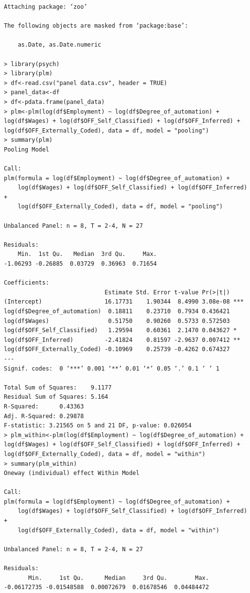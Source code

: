 \documentclass[12pt]{article}
\begin{document}
\begin{verbatim}
Attaching package: ‘zoo’

The following objects are masked from ‘package:base’:

    as.Date, as.Date.numeric

> library(psych)
> library(plm)
> df<-read.csv("panel data.csv", header = TRUE)
> panel_data<-df
> df<-pdata.frame(panel_data)
> plm<-plm(log(df$Employment) ~ log(df$Degree_of_automation) + log(df$Wages) + log(df$OFF_Self_Classified) + log(df$OFF_Inferred) + log(df$OFF_Externally_Coded), data = df, model = "pooling")
> summary(plm)
Pooling Model

Call:
plm(formula = log(df$Employment) ~ log(df$Degree_of_automation) + 
    log(df$Wages) + log(df$OFF_Self_Classified) + log(df$OFF_Inferred) + 
    log(df$OFF_Externally_Coded), data = df, model = "pooling")

Unbalanced Panel: n = 8, T = 2-4, N = 27

Residuals:
    Min.  1st Qu.   Median  3rd Qu.     Max. 
-1.06293 -0.26885  0.03729  0.36963  0.71654 

Coefficients:
                             Estimate Std. Error t-value Pr(>|t|)    
(Intercept)                  16.17731    1.90344  8.4990 3.08e-08 ***
log(df$Degree_of_automation)  0.18811    0.23710  0.7934 0.436421    
log(df$Wages)                 0.51750    0.90260  0.5733 0.572503    
log(df$OFF_Self_Classified)   1.29594    0.60361  2.1470 0.043627 *  
log(df$OFF_Inferred)         -2.41824    0.81597 -2.9637 0.007412 ** 
log(df$OFF_Externally_Coded) -0.10969    0.25739 -0.4262 0.674327    
---
Signif. codes:  0 ‘***’ 0.001 ‘**’ 0.01 ‘*’ 0.05 ‘.’ 0.1 ‘ ’ 1

Total Sum of Squares:    9.1177
Residual Sum of Squares: 5.164
R-Squared:      0.43363
Adj. R-Squared: 0.29878
F-statistic: 3.21565 on 5 and 21 DF, p-value: 0.026054
> plm_within<-plm(log(df$Employment) ~ log(df$Degree_of_automation) + log(df$Wages) + log(df$OFF_Self_Classified) + log(df$OFF_Inferred) + log(df$OFF_Externally_Coded), data = df, model = "within")
> summary(plm_within)
Oneway (individual) effect Within Model

Call:
plm(formula = log(df$Employment) ~ log(df$Degree_of_automation) + 
    log(df$Wages) + log(df$OFF_Self_Classified) + log(df$OFF_Inferred) + 
    log(df$OFF_Externally_Coded), data = df, model = "within")

Unbalanced Panel: n = 8, T = 2-4, N = 27

Residuals:
       Min.     1st Qu.      Median     3rd Qu.        Max. 
-0.06172735 -0.01548588  0.00072679  0.01678546  0.04484472 


\end{verbatim}
\end{document}
